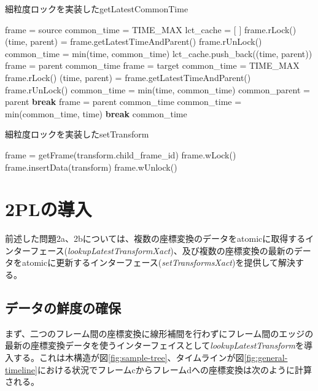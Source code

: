 \documentclass[a4paper]{jreport}	%
\begin{document}
\begin{algorithm}
\caption{細粒度ロックを実装したgetLatestCommonTime} \label{algo:getLatestCommonTime2}
\begin{algorithmic}[1]
	\State frame = source
	\State common\_time = TIME\_MAX
	\State lct\_cache = [ ] 
	\State frame.rLock()
	\State (time, parent) = frame.getLatestTimeAndParent()
	\State frame.rUnLock()
	\State common\_time = min(time, common\_time)
	\State lct\_cache.push\_back((time, parent))
	\State frame = parent
	\State \Return common\_time
	\EndIf
	\EndWhile
	\State frame = target
	\State common\_time = TIME\_MAX
	\State frame.rLock()
	\State (time, parent) = frame.getLatestTimeAndParent()
	\State frame.rUnLock()
	\State common\_time = min(time, common\_time)
	\State common\_parent = parent
	\State \textbf{break}
	\EndIf
	\State frame = parent
	\State \Return common\_time
	\EndIf
	\EndWhile
	\State common\_time = min(common\_time, time)
	\State \textbf{break}
	\EndIf
	\EndFor
	\State \Return common\_time
	\EndFunction
\end{algorithmic}
\end{algorithm}

\begin{algorithm}
\caption{細粒度ロックを実装したsetTransform}\label{algo:setTransform2}
\begin{algorithmic}[1]
	\State frame = getFrame(transform.child\_frame\_id)
	\State frame.wLock() 
	\State frame.insertData(transform)
	\State frame.wUnlock() 
	\EndProcedure
\end{algorithmic}
\end{algorithm}



\section{2PLの導入}
\label{section:intro-2pl}

前述した問題2a、2bについては、複数の座標変換のデータをatomicに取得するインターフェース(\textit{lookupLatestTransformXact})、及び複数の座標変換の最新のデータをatomicに更新するインターフェース(\textit{setTransformsXact})を提供して解決する。

\subsection{データの鮮度の確保}
まず、二つのフレーム間の座標変換に線形補間を行わずにフレーム間のエッジの最新の座標変換データを使うインターフェイスとして\textit{lookupLatestTransform}を導入する。これは木構造が図\ref{fig:sample-tree}、タイムラインが図\ref{fig:general-timeline}における状況でフレームcからフレームdへの座標変換は次のように計算される。
\end{document}

